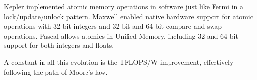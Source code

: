 Kepler implemented atomic memory operations in software just like Fermi in a lock/update/unlock pattern.
Maxwell enabled native hardware support for atomic operations with 32-bit integers and 32-bit and 64-bit compare-and-swap operations.
Pascal allows atomics in Unified Memory, including 32 and 64-bit support for both integers and floats.

A constant in all this evolution is the TFLOPS/W improvement, effectively following the path of Moore's law.


